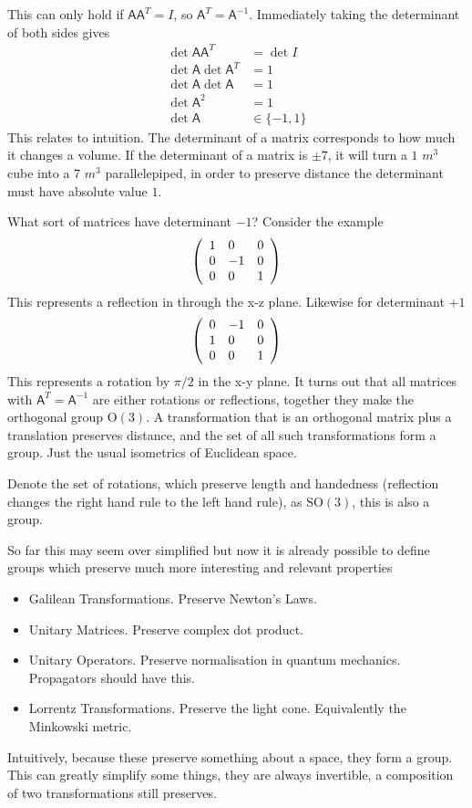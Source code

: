 \documentclass[twocolumn,floatfix,aps,prd,amsmath,amssymb]{revtex4}
\begin{document}
This can only hold if $\mathsf{A}\mathsf{A}^T=I$, so $\mathsf{A}^T = \mathsf{A}^{-1}$. Immediately taking the determinant of both sides gives
\begin{align*}
\det \mathsf{A}\mathsf{A}^T &= \det I \\
\det \mathsf{A} \det \mathsf{A}^T &= 1 \\
\det \mathsf{A} \det \mathsf{A} &= 1 \\
\det \mathsf{A}^2 &= 1 \\
\det \mathsf{A} &\in \{-1,1\}
\end{align*}
This relates to intuition. The determinant of a matrix corresponds to how much it changes a volume. If the determinant of a matrix is $\pm 7$, it will turn a $1$ $m^3$ cube into a $7$ $m^3$ parallelepiped, in order to preserve distance the determinant must have absolute value $1$.

What sort of matrices have determinant $-1$? Consider the example
\begin{align*}
\left( \begin{array}{l l l}
1 &0&0 \\
0&-1&0 \\
0&0&1
\end{array} \right)
\end{align*}
This represents a reflection in through the x-z plane. Likewise for determinant $+1$
\begin{align*}
\left( \begin{array}{l l l}
0&-1&0 \\
1&0&0 \\
0&0&1
\end{array} \right)
\end{align*}
This represents a rotation by $\pi/2$ in the x-y plane. It turns out that all matrices with $\mathsf{A}^T = \mathsf{A}^{-1}$ are either rotations or reflections, together they make the orthogonal group $\mathrm{O}(3)$. A transformation that is an orthogonal matrix plus a translation preserves distance, and the set of all such transformations form a group. Just the usual isometrics of Euclidean space.

Denote the set of rotations, which preserve length and handedness (reflection changes the right hand rule to the left hand rule), as $\mathrm{SO}(3)$, this is also a group.

So far this may seem over simplified but now it is already possible to define groups which preserve much more interesting and relevant properties
\begin{itemize}
\item Galilean Transformations. Preserve Newton's Laws.
\item Unitary Matrices. Preserve complex dot product.
\item Unitary Operators. Preserve normalisation in quantum mechanics. Propagators should have this.
\item Lorrentz Transformations. Preserve the light cone. Equivalently the Minkowski metric.
\end{itemize}
Intuitively, because these preserve something about a space, they form a group. This can greatly simplify some things, they are always invertible, a composition of two transformations still preserves.
\end{document}
